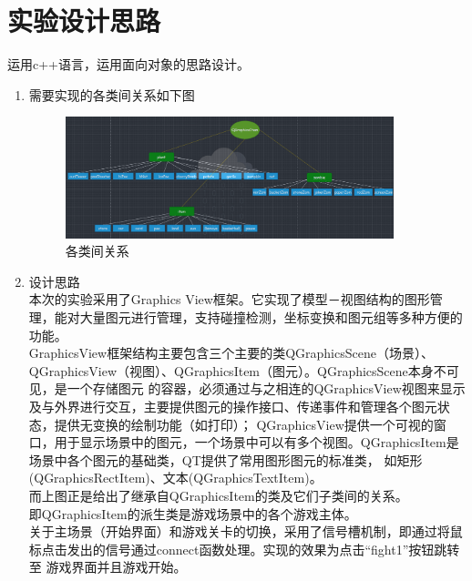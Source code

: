 \documentclass[12pt,a4paper,UTF8]{article}
\begin{document}
\section{实验设计思路}
    运用c++语言，运用面向对象的思路设计。
    \begin{enumerate}
      \item 需要实现的各类间关系如下图
          \begin{figure}[H]
            \centering
          \includegraphics[width=0.9\textwidth]{figure/UMI.png}
          \caption{各类间关系}
          \end{figure}
    \item 设计思路\\
          本次的实验采用了Graphics View框架。它实现了模型－视图结构的图形管理，能对大量图元进行管理，支持碰撞检测，坐标变换和图元组等多种方便的功能。\\
          GraphicsView框架结构主要包含三个主要的类QGraphicsScene（场景）、QGraphicsView（视图）、QGraphicsItem（图元）。QGraphicsScene本身不可见，是一个存储图元
          的容器，必须通过与之相连的QGraphicsView视图来显示及与外界进行交互，主要提供图元的操作接口、传递事件和管理各个图元状态，提供无变换的绘制功能（如打印）；
          QGraphicsView提供一个可视的窗口，用于显示场景中的图元，一个场景中可以有多个视图。QGraphicsItem是场景中各个图元的基础类，QT提供了常用图形图元的标准类，
          如矩形(QGraphicsRectItem)、文本(QGraphicsTextItem)。\\

          而上图正是给出了继承自QGraphicsItem的类及它们子类间的关系。\\

          即QGraphicsItem的派生类是游戏场景中的各个游戏主体。\\

          关于主场景（开始界面）和游戏关卡的切换，采用了信号槽机制，即通过将鼠标点击发出的信号通过connect函数处理。实现的效果为点击“fight1”按钮跳转至
          游戏界面并且游戏开始。

    \end{enumerate}
\end{document}
